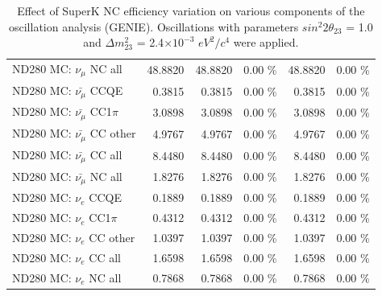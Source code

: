 \begin{table}
\begin{tabular}{| l | r | r  r | r  r |}
                                          ND280 MC: $\nu_{\mu}$ NC all &         48.8820 &         48.8820 &  0.00 \%  &         48.8820 &  0.00 \%  \\ 
                                      ND280 MC: $\bar{\nu_{\mu}}$ CCQE &          0.3815 &          0.3815 &  0.00 \%  &          0.3815 &  0.00 \%  \\ 
                                  ND280 MC: $\bar{\nu_{\mu}}$ CC1$\pi$ &          3.0898 &          3.0898 &  0.00 \%  &          3.0898 &  0.00 \%  \\ 
                                  ND280 MC: $\bar{\nu_{\mu}}$ CC other &          4.9767 &          4.9767 &  0.00 \%  &          4.9767 &  0.00 \%  \\ 
                                    ND280 MC: $\bar{\nu_{\mu}}$ CC all &          8.4480 &          8.4480 &  0.00 \%  &          8.4480 &  0.00 \%  \\ 
                                    ND280 MC: $\bar{\nu_{\mu}}$ NC all &          1.8276 &          1.8276 &  0.00 \%  &          1.8276 &  0.00 \%  \\ 
                                              ND280 MC: $\nu_{e}$ CCQE &          0.1889 &          0.1889 &  0.00 \%  &          0.1889 &  0.00 \%  \\ 
                                          ND280 MC: $\nu_{e}$ CC1$\pi$ &          0.4312 &          0.4312 &  0.00 \%  &          0.4312 &  0.00 \%  \\ 
                                          ND280 MC: $\nu_{e}$ CC other &          1.0397 &          1.0397 &  0.00 \%  &          1.0397 &  0.00 \%  \\ 
                                            ND280 MC: $\nu_{e}$ CC all &          1.6598 &          1.6598 &  0.00 \%  &          1.6598 &  0.00 \%  \\ 
                                            ND280 MC: $\nu_{e}$ NC all &          0.7868 &          0.7868 &  0.00 \%  &          0.7868 &  0.00 \%  \\ 
\hline
\end{tabular}
\caption{ 
  Effect of SuperK NC efficiency variation
  on various components of the oscillation analysis (GENIE).
  Oscillations with parameters $sin^{2}2\theta_{23}$ = 1.0 and $\Delta m^{2}_{23}$ = 2.4$\times10^{-3}$ $eV^{2}/c^{4}$ were applied.  
}
\label{tab:genie_sk_nc_eff}
\end{table}


%
%
%
%


